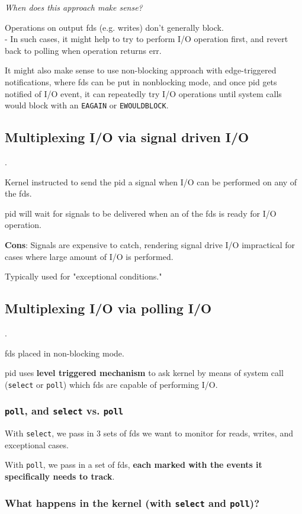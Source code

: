 \documentclass[10pt]{amsart}
\begin{document}
\emph{When does this approach make sense?}

Operations on output fds (e.g. writes) don't generally block.  \\
- In such cases, it might help to try to perform I/O operation first, and revert back to polling when operation returns err.

It might also make sense to use non-blocking approach with edge-triggered notifications, where fds can be put in nonblocking mode, and once pid gets notified of I/O event, it can repeatedly try I/O operations until system calls would block with an \texttt{EAGAIN} or \texttt{EWOULDBLOCK}. 

\subsection{Multiplexing I/O via signal driven I/O}.

Kernel instructed to send the pid a signal when I/O can be performed on any of the fds.

pid will wait for signals to be delivered when an of the fds is ready for I/O operation.

\textbf{Cons}: Signals are expensive to catch, rendering signal drive I/O impractical for cases where large amount of I/O is performed.

Typically used for "exceptional conditions."

\subsection{Multiplexing I/O via polling I/O}.

fds placed in non-blocking mode.

pid uses \textbf{level triggered mechanism} to ask kernel by means of system call (\texttt{select} or \texttt{poll}) which fds are capable of performing I/O. 

\subsubsection{\texttt{poll}, and \texttt{select} vs. \texttt{poll} }

With \texttt{select}, we pass in 3 sets of fds we want to monitor for reads, writes, and exceptional cases.

With \texttt{poll}, we pass in a set of fds, \textbf{each marked with the events it specifically needs to track}.

\subsubsection{What happens in the kernel (with \texttt{select} and \texttt{poll})?}
\end{document}
